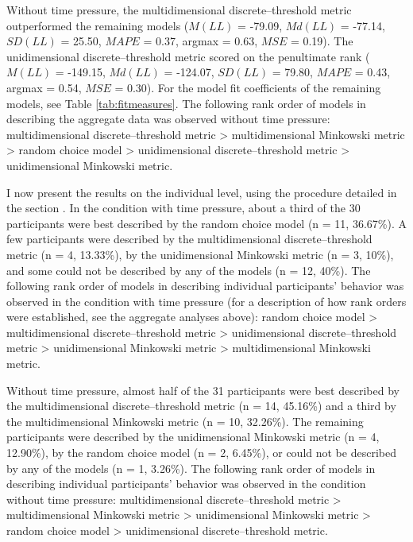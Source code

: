 \documentclass[a4paper,man,natbib]{apa6}
\begin{document}
Without time pressure, the multidimensional discrete--threshold metric outperformed the remaining models ($M(LL)$ = -79.09, $Md(LL)$ = -77.14, $SD(LL)$ = 25.50, $MAPE$ = 0.37, argmax = 0.63, $MSE$ = 0.19). The unidimensional discrete--threshold metric scored on the penultimate rank ($M(LL)$ = -149.15, $Md(LL)$ = -124.07, $SD(LL)$ = 79.80, $MAPE$ = 0.43, argmax = 0.54, $MSE$ = 0.30). For the model fit coefficients of the remaining models, see Table \ref{tab:fitmeasures}. The following rank order of models in describing the aggregate data was observed without time pressure: multidimensional discrete--threshold metric > multidimensional Minkowski metric > random choice model > unidimensional discrete--threshold metric > unidimensional Minkowski metric.

I now present the results on the individual level, using the procedure detailed in the section . In the condition with time pressure, about a third of the 30 participants were best described by the random choice model (n = 11, 36.67\%). A few participants were described by the multidimensional discrete--threshold metric (n = 4, 13.33\%), by the unidimensional Minkowski metric (n = 3, 10\%), and some could not be described by any of the models (n = 12, 40\%). The following rank order of models in describing individual participants' behavior was observed in the condition with time pressure (for a description of how rank orders were established, see the aggregate analyses above): random choice model > multidimensional discrete--threshold metric > unidimensional discrete--threshold metric > unidimensional Minkowski metric > multidimensional Minkowski metric. 

Without time pressure, almost half of the 31 participants were best described by the multidimensional discrete--threshold metric (n = 14, 45.16\%) and a third by the multidimensional Minkowski metric (n = 10, 32.26\%). The remaining participants were described by the unidimensional Minkowski metric (n = 4, 12.90\%), by the random choice model (n = 2, 6.45\%), or could not be described by any of the models (n = 1, 3.26\%). The following rank order of models in describing individual participants' behavior was observed in the condition without time pressure: multidimensional discrete--threshold metric > multidimensional Minkowski metric > unidimensional Minkowski metric > random choice model > unidimensional discrete--threshold metric.
\end{document}
